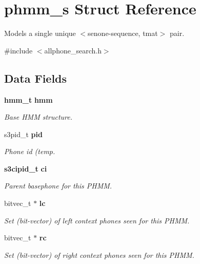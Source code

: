 \section{phmm\+\_\+s Struct Reference}
\label{structphmm__s}


Models a single unique $<$senone-\/sequence, tmat$>$ pair.  




{\ttfamily \#include $<$allphone\+\_\+search.\+h$>$}

\subsection*{Data Fields}
\begin{DoxyCompactItemize}
\item 
\mbox{\label{structphmm__s_a829311265f8df700c9fb628f5bdff0ad}} 
\textbf{ hmm\+\_\+t} \textbf{ hmm}
\begin{DoxyCompactList}\small\item\em Base H\+MM structure. \end{DoxyCompactList}\item 
s3pid\+\_\+t \textbf{ pid}
\begin{DoxyCompactList}\small\item\em Phone id (temp. \end{DoxyCompactList}\item 
\mbox{\label{structphmm__s_afe385b65ca02fb4e3a087a0997ea4eac}} 
\textbf{ s3cipid\+\_\+t} \textbf{ ci}
\begin{DoxyCompactList}\small\item\em Parent basephone for this P\+H\+MM. \end{DoxyCompactList}\item 
\mbox{\label{structphmm__s_aad9f810256dea9ee491d21eb3a349d1c}} 
bitvec\+\_\+t $\ast$ \textbf{ lc}
\begin{DoxyCompactList}\small\item\em Set (bit-\/vector) of left context phones seen for this P\+H\+MM. \end{DoxyCompactList}\item 
\mbox{\label{structphmm__s_a94ead49959a95398643178d8dc1609f8}} 
bitvec\+\_\+t $\ast$ \textbf{ rc}
\begin{DoxyCompactList}\small\item\em Set (bit-\/vector) of right context phones seen for this P\+H\+MM. \end{DoxyCompactList}\item 
\mbox{\label{structphmm__s_a62c94d334abbbd2431d5e7e0ace79a14}} 

\end{DoxyCompactItemize}
